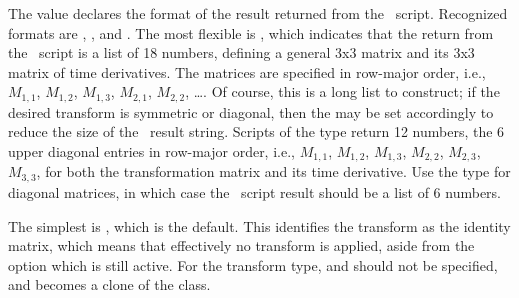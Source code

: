\begin{itemize}
\begin{description}
   The   value declares the
   format of the result returned from the \Tcl\ script.  Recognized
   formats are , ,  and
   .  The most flexible is , which indicates
   that the return from the \Tcl\ script is a list of 18 numbers,
   defining a general 3x3 matrix and its 3x3 matrix of time derivatives.
   The matrices are specified in row-major order, i.e., $M_{1,1}$,
   $M_{1,2}$, $M_{1,3}$, $M_{2,1}$, $M_{2,2}$, \ldots.  Of course, this
   is a long list to construct; if the desired transform is symmetric or
   diagonal, then the  may be set accordingly to reduce the
   size of the \Tcl\ result string.  Scripts of the  type
   return 12 numbers, the 6 upper diagonal entries in row-major order,
   i.e., $M_{1,1}$, $M_{1,2}$, $M_{1,3}$, $M_{2,2}$, $M_{2,3}$,
   $M_{3,3}$, for both the transformation matrix and its time
   derivative.  Use the  type for diagonal matrices, in
   which case the \Tcl\ script result should be a list of 6 numbers.

   The simplest  is , which is the
   default.  This identifies the transform as the identity matrix, which
   means that effectively no transform is applied, aside from the
    option which is still active.  For the 
   transform type,  and  should not be
   specified, and  becomes a clone of the
    class.


\end{description}
\end{itemize}
